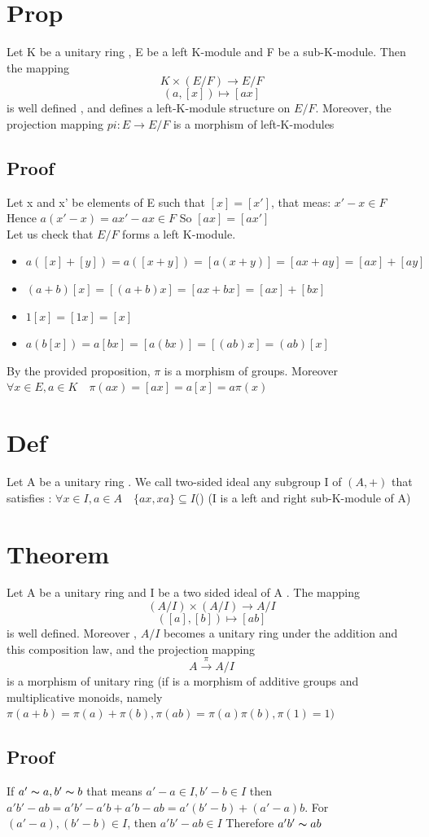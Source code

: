 \documentclass{book}
\begin{document}
\section{Prop}
Let K be a unitary ring , E be a left K-module and F be a sub-K-module. Then the mapping $$K\times(E/ F)\rightarrow E / F$$$$(a,[x])\mapsto[ax]$$
is well defined , and defines a left-K-module structure on $E/F$. Moreover, the projection mapping $pi:E\rightarrow E/F$ is a morphism of left-K-modules
\subsection*{Proof}
Let x and x' be elements of E such that $[x]=[x']$, that meas: $x'-x\in F$ Hence $a(x'-x)=ax'-ax\in F$ So $[ax]=[ax']$\\
Let us check that $E/F$ forms a left K-module.
\begin{itemize}
    \item $a([x]+[y])=a([x+y])=[a(x+y)]=[ax+ay]=[ax]+[ay]$
    \item $(a+b)[x]=[(a+b)x]=[ax+bx]=[ax]+[bx]$
    \item $1[x]=[1x]=[x]$
    \item $a(b[x])=a[bx]=[a(bx)]=[(ab)x]=(ab)[x]$
\end{itemize}
By the provided proposition, $\pi $ is a morphism of groups. Moreover $\forall x\in E,a\in K\quad \pi(ax)=[ax]=a[x]=a\pi(x)$
\section{Def}
Let A be a unitary ring . We call two-sided ideal any subgroup I of $(A,+)$ that satisfies : $\forall x\in I,a\in A\quad \{ax,xa\}\subseteq I$() (I is a left and right sub-K-module of A)
\section{Theorem}
Let A be a unitary ring and I be a two sided ideal of A . The mapping $$(A/I)\times(A/I)\rightarrow A/I$$$$([a],[b])\mapsto[ab]$$ is well defined. Moreover , $A/I$ becomes a unitary ring under the addition and this composition law, and the projection mapping $$A\stackrel{\pi}{\longrightarrow} A/I$$ is a morphism of unitary ring (if is a morphism of additive groups and multiplicative monoids, namely $\pi(a+b)=\pi(a)+\pi(b), \pi(ab)=\pi(a)\pi(b),\pi(1)=1)$
\subsection*{Proof}
If $a'\thicksim a,b'\thicksim b$ that means $a'-a\in I,b'-b\in I$ then $a'b'-ab=a'b'-a'b+a'b-ab=a'(b'-b)+(a'-a)b$. For $(a'-a),(b'-b)\in I$, then $a'b'-ab\in I$ Therefore $a'b'\thicksim ab$
\end{document}
